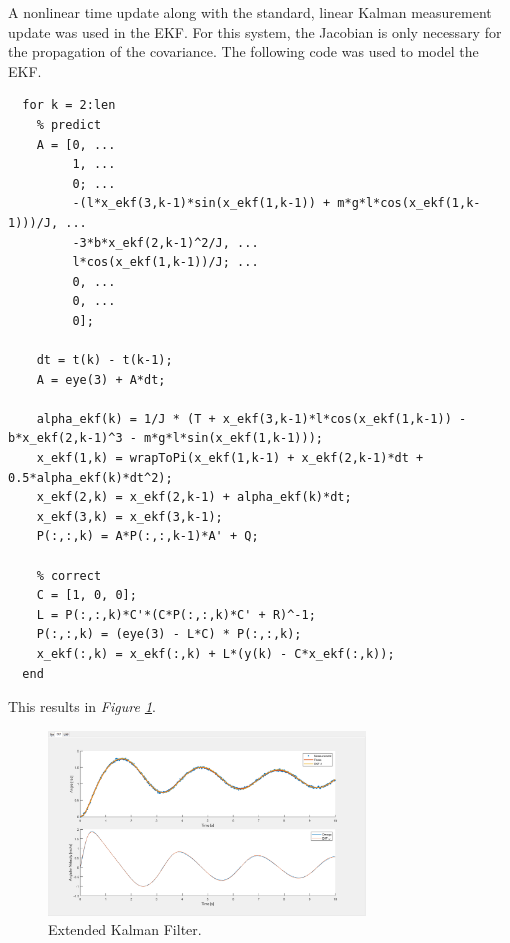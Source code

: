 \documentclass[10pt]{article}
\begin{document}
\begin{enumerate}[label=\textbf{\arabic*.}]
  A nonlinear time update along with the standard, linear Kalman measurement 
  update was used in the EKF. For this system, the Jacobian is only necessary 
  for the propagation of the covariance. The following code was used to model 
  the EKF.
  \begin{lstlisting}
  for k = 2:len
    % predict
    A = [0, ...
         1, ...  
         0; ...
         -(l*x_ekf(3,k-1)*sin(x_ekf(1,k-1)) + m*g*l*cos(x_ekf(1,k-1)))/J, ...
         -3*b*x_ekf(2,k-1)^2/J, ... 
         l*cos(x_ekf(1,k-1))/J; ...
         0, ...
         0, ...
         0];
    
    dt = t(k) - t(k-1);
    A = eye(3) + A*dt;

    alpha_ekf(k) = 1/J * (T + x_ekf(3,k-1)*l*cos(x_ekf(1,k-1)) - b*x_ekf(2,k-1)^3 - m*g*l*sin(x_ekf(1,k-1)));
    x_ekf(1,k) = wrapToPi(x_ekf(1,k-1) + x_ekf(2,k-1)*dt + 0.5*alpha_ekf(k)*dt^2);
    x_ekf(2,k) = x_ekf(2,k-1) + alpha_ekf(k)*dt;
    x_ekf(3,k) = x_ekf(3,k-1);
    P(:,:,k) = A*P(:,:,k-1)*A' + Q;

    % correct
    C = [1, 0, 0];
    L = P(:,:,k)*C'*(C*P(:,:,k)*C' + R)^-1;
    P(:,:,k) = (eye(3) - L*C) * P(:,:,k);
    x_ekf(:,k) = x_ekf(:,k) + L*(y(k) - C*x_ekf(:,k));
  end
  \end{lstlisting}

  This results in \emph{Figure \ref{fig:2}}.

  \begin{figure}[H]
    \centering
    \includegraphics[width=0.75\textwidth]{p1_ekf.png}
    \caption{Extended Kalman Filter.}
    \label{fig:2}
  \end{figure}


\end{enumerate}
\end{document}
